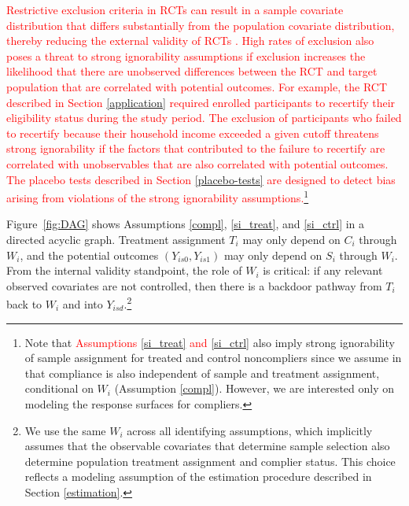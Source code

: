 \documentclass[hidelinks,12pt]{article}
\begin{document}
\textcolor{red}{Restrictive exclusion criteria in RCTs can result in a sample covariate distribution that differs substantially from the population covariate distribution, thereby reducing the external validity of RCTs \citep{rothwell2005external}. High rates of exclusion also poses a threat to strong ignorability assumptions if exclusion increases the likelihood that there are unobserved differences between the RCT and target population that are correlated with potential outcomes. For example, the RCT described in Section \ref{application} required enrolled participants to recertify their eligibility status during the study period. The exclusion of participants who failed to recertify because their household income exceeded a given cutoff threatens strong ignorability if the factors that contributed to the failure to recertify are correlated with unobservables that are also correlated with potential outcomes. The placebo tests described in Section \ref{placebo-tests} are designed to detect bias arising from violations of the strong ignorability assumptions.}\footnote{Note that \textcolor{red}{Assumptions \eqref{si_treat} and \eqref{si_ctrl}} also imply strong ignorability of sample assignment for treated and control noncompliers since we assume in that compliance is also independent of sample and treatment assignment, conditional on $W_i$ (Assumption \eqref{compl}). However, we are interested only on modeling the response surfaces for compliers.}

Figure~\ref{fig:DAG} shows Assumptions \eqref{compl}, \eqref{si_treat}, and \eqref{si_ctrl} in a directed acyclic graph. Treatment assignment $T_i$ may only depend on $C_i$ through $W_i$, and the potential outcomes $(Y_{is0}, Y_{is1})$ may only depend on $S_i$ through $W_i$. From the internal validity standpoint, the role of $W_i$ is critical: if any relevant observed covariates are not controlled, then there is a backdoor pathway from $T_i$ back to $W_i$ and into $Y_{isd}$.\footnote{We use the same $W_i$ across all identifying assumptions, which implicitly assumes that the observable covariates that determine sample selection also determine population treatment assignment and complier status. This choice reflects a modeling assumption of the estimation procedure described in Section \ref{estimation}.}
\end{document}
